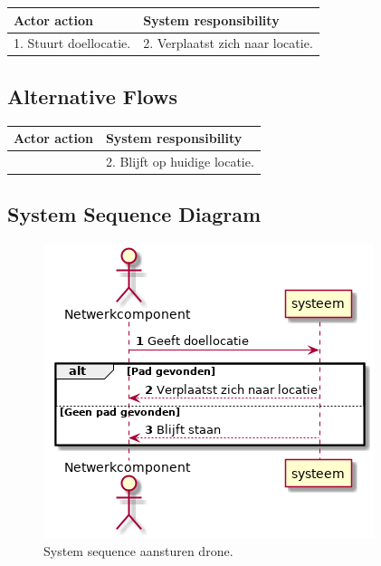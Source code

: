 \documentclass[a4paper, 11pt, oneside]{report}
\begin{document}
\begin{table}[H]
	\centering
	\begin{tabular}{|l|l|}
		\hline
		\rowcolor[HTML]{C0C0C0} 
		Actor action  & System responsibility   \\ \hline
		1. Stuurt doellocatie. & 2. Verplaatst zich naar locatie. \\ \hline
	\end{tabular}
\end{table}

\subsection{Alternative Flows}


\begin{table}[H]
	\centering
	\begin{tabular}{|l|l|}
		\hline
		\rowcolor[HTML]{C0C0C0} 
		Actor action  & System responsibility   \\ \hline
				      & 2. Blijft op huidige locatie.                        \\ \hline
	\end{tabular}
\end{table}


\subsection{System Sequence Diagram }
\label{Usecase:aansturendrone:systemsequence}


\begin{figure}[H]
	\begin{center}\includegraphics[height=.25\textheight]{UML/out/usecase/sequence/aansturendrone/aansturendrone.png}\end{center}
	\caption{System sequence aansturen drone.}
	\label{fig:aansturendrone:systemsequence}
\end{figure}
\end{document}

